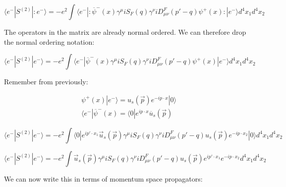\documentclass[a4]{article}
\begin{document}
        \begin{framed}

            \begin{equation}
                \langle e^{-} | S^{(2)} |: e^{-} \rangle = - e^2 \int \langle e^{-} |: \overline{\psi}^{-} (x) \gamma^{\mu} i S_{F} (q) \gamma^{\nu} i D_{\mu \nu}^{F} (p' - q) \psi^{+} (x) :| e^{-} \rangle d^4 x_1 d^4 x_2
            \end{equation}
            
            The operators in the matrix are already normal ordered. We can therefore drop the normal ordering notation:

            \begin{equation}
                \langle e^{-} | S^{(2)} | e^{-} \rangle = - e^2 \int \langle e^{-} | \overline{\psi}^{-} (x) \gamma^{\mu} i S_{F} (q) \gamma^{\nu} i D_{\mu \nu}^{F} (p' - q) \psi^{+} (x) | e^{-} \rangle d^4 x_1 d^4 x_2
            \end{equation}

            Remember from previously:

            \begin{equation}
                \begin{aligned}
                    \psi^{+} (x) | e^{-} \rangle = u_{s} (\vec{p}) e^{- i p \cdot x} | 0 \rangle \\
                    \langle e^{-} | \overline{\psi}^{-} (x) = \langle 0 | e^{i p \cdot x} \overline{u}_{s} (\vec{p})
                \end{aligned}
            \end{equation}

            \begin{equation}
                \langle e^{-} | S^{(2)} | e^{-} \rangle = - e^2 \int \langle 0 | e^{ i p' \cdot x_1} \vec{u}_{s} (\vec{p}) \gamma^{\mu} i S_{F} (q) \gamma^{\nu} i D_{\mu \nu}^{F} (p' - q) u_{s} (\vec{p}) e^{- i p \cdot x_2} | 0 \rangle d^4 x_1 d^4 x_2
            \end{equation}

            \begin{equation}
                \langle e^{-} | S^{(2)} | e^{-} \rangle = - e^2 \int \vec{u}_{s} (\vec{p}) \gamma^{\mu} i S_{F} (q) \gamma^{\nu} i D_{\mu \nu}^{F} (p' - q) u_{s} (\vec{p}) e^{ i p' \cdot x_1} e^{- i p \cdot x_2} d^4 x_1 d^4 x_2
            \end{equation}

            We can now write this in terms of momentum space propagators:


\end{framed}
\end{document}
